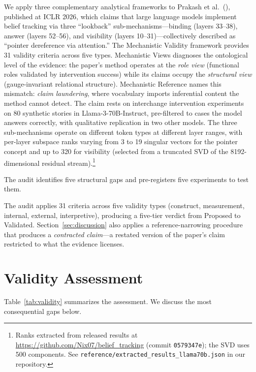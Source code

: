 \documentclass[11pt]{article}
\begin{document}
We apply three complementary analytical frameworks to Prakash et al.\ (\citeyear{prakash2025lookback}), published at ICLR 2026, which claims that large language models implement belief tracking via three ``lookback'' sub-mechanisms---binding (layers 33--38), answer (layers 52--56), and visibility (layers 10--31)---collectively described as ``pointer dereference via attention.'' The Mechanistic Validity framework \citep{tower2026mechval} provides 31 validity criteria across five types. Mechanistic Views \citep{tower2026mechviews} diagnoses the ontological level of the evidence: the paper's method operates at the \emph{role view} (functional roles validated by intervention success) while its claims occupy the \emph{structural view} (gauge-invariant relational structure). Mechanistic Reference \citep{tower2026mechref} names this mismatch: \emph{claim laundering}, where vocabulary imports inferential content the method cannot detect. The claim rests on interchange intervention experiments on 80 synthetic stories in Llama-3-70B-Instruct, pre-filtered to cases the model answers correctly, with qualitative replication in two other models. The three sub-mechanisms operate on different token types at different layer ranges, with per-layer subspace ranks varying from 3 to 19 singular vectors for the pointer concept and up to 320 for visibility (selected from a truncated SVD of the 8192-dimensional residual stream).\footnote{Ranks extracted from released results at \url{https://github.com/Nix07/belief_tracking} (commit \texttt{0579347e}); the SVD uses 500 components. See \texttt{reference/extracted\_results\_llama70b.json} in our repository.}

The audit identifies five structural gaps and pre-registers five experiments to test them.

The audit applies 31 criteria across five validity types (construct, measurement, internal, external, interpretive), producing a five-tier verdict from Proposed to Validated. Section~\ref{sec:discussion} also applies a reference-narrowing procedure that produces a \emph{contracted claim}---a restated version of the paper's claim restricted to what the evidence licenses.


\section{Validity Assessment}
\label{sec:validity}

Table~\ref{tab:validity} summarizes the assessment. We discuss the most consequential gaps below.
\end{document}
